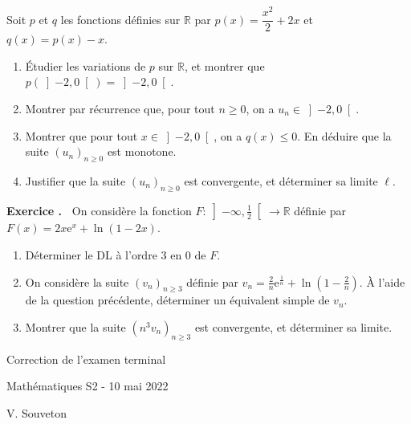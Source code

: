 \documentclass[10pt,a4paper,french]{article}
\newcounter{exono}
\newcounter{questionno}
\newcommand\exo
  {\addtocounter{exono}{1}
   \bigbreak\textbf{Exercice \theexono.\ }
   \setcounter{questionno}{0}}
\newcommand\R{{\mathbb{R}}}
\begin{document}
Soit $p$ et $q$ les fonctions définies sur $\R$ par $p(x)=\dfrac{x^2}2+2x$ et $q(x)=p(x)-x$.
\begin{enumerate}
    \item \'Etudier les variations de $p$ sur $\R$, et montrer que $p(\left]-2, 0\right[)=\left]-2, 0\right[$. 
    \item Montrer par récurrence que, pour tout $n \geq 0$, on a $u_n \in \left]-2, 0\right[$.
    \item Montrer que pour tout $x \in \left]-2, 0\right[$, on a $q(x) \leq 0$. En déduire que la suite $(u_n)_{n \geq 0}$ est monotone.
    \item Justifier que la suite $(u_n)_{n \geq 0}$ est convergente, et déterminer sa limite $\ell$.
    
\end{enumerate}

\exo On considère la fonction $F \colon \left]-\infty, \frac{1}{2}\right[ \to \R$ définie par $F(x)=2x\mathrm{e}^x+\ln(1-2x)$.
\begin{enumerate}
    \item Déterminer le DL à l'ordre 3 en 0 de $F$.
    \item On considère la suite $(v_n)_{n \geq 3}$ définie par $v_n=\frac{2}{n}\mathrm{e}^{\frac{1}{n}}+\ln(1-\frac{2}{n})$. \`A l'aide de la question précédente, déterminer un équivalent simple de $v_n$.
    \item Montrer que la suite $(n^3v_n)_{n \geq 3}$ est convergente, et déterminer sa limite.
\end{enumerate}







\newpage

\begin{center}
	\huge Correction de l'examen terminal
	
	\large Mathématiques S2 - 10 mai 2022
	
	\large V. Souveton
\end{center}
\end{document}
